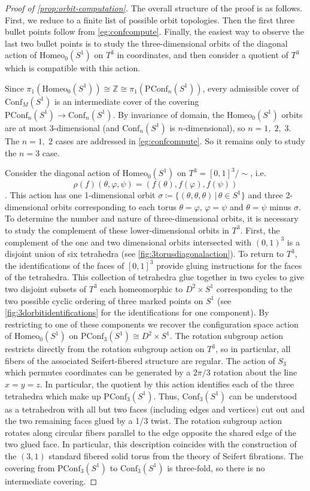 \documentclass[10pt, oneside]{article}
\newcommand{\Z}{\mathbb{Z}}
\newcommand{\homeo}[1][S^1]{\text{Homeo}_0(#1)}
\newcommand{\conf}[2][S^1]{\text{Conf}_{#2}(#1)}
\newcommand{\pconf}[2][S^1]{\text{PConf}_{#2}(#1)}
\theoremstyle{definition}
\theoremstyle{definition}
\begin{document}
\begin{proof}[Proof of \cref{prop:orbit-computation}]
    The overall structure of the proof is as follows. First, we reduce to a finite list of possible orbit topologies. Then the first three bullet points follow from \cref{eg:confcompute}. Finally, the easiest way to observe the last two bullet points is to study the three-dimensional orbits of the diagonal action of $\homeo$ on $T^3$ in coordinates, and then consider a quotient of $T^3$ which is compatible with this action.  

    Since $\pi_1(\homeo) \cong \Z \cong \pi_1(\pconf[S^1]{n})$, every admissible cover of $\conf[S^1]{M}$ is an intermediate cover of the covering $\pconf[S^1]{n}\to \conf[S^1]{n}$. By invariance of domain, the $\homeo$ orbits are at most 3-dimensional (and $\conf[S^1]{n}$ is $n$-dimensional), so $n=1,\; 2,\; 3$. The $n=1,\; 2$ cases are addressed in \cref{eg:confcompute}. So it remains only to study the $n=3$ case. 

    Consider the diagonal action of $\homeo$ on $T^3=[0,1]^3/\sim$, i.e. $$\rho(f)(\theta, \varphi, \psi) = (f(\theta), f(\varphi), f(\psi))$$. This action has one 1-dimensional orbit $\sigma \coloneqq \{(\theta,\theta,\theta)\,\vert\,\theta\in S^1\}$ and three 2-dimensional orbits corresponding to each torus $\theta=\varphi$, $\varphi=\psi$ and $\theta=\psi$ minus $\sigma$. To determine the number and nature of three-dimensional orbits, it is necessary to study the complement of these lower-dimensional orbits in $T^3$. First, the complement of the one and two dimensional orbits intersected with $(0,1)^3$ is a disjoint union of six tetrahedra (see \cref{fig:3torusdiagonalaction}). To return to $T^3$, the identifications of the faces of $[0,1]^3$ provide gluing instructions for the faces of the tetrahedra. This collection of tetrahedra glue together in two cycles to give two disjoint subsets of $T^3$ each homeomorphic to $D^2 \times S^1$ corresponding to the two possible cyclic ordering of three marked points on $S^1$ (see \cref{fig:3dorbitidentifications} for the identifications for one component). By restricting to one of these components we recover the configuration space action of $\homeo$ on $\pconf[S^1]{3}\cong D^2 \times S^1$. The rotation subgroup action restricts directly from the rotation subgroup action on $T^3$, so in particular, all fibers of the associated Seifert-fibered structure are regular. The action of $S_3$ which permutes coordinates can be generated by a $2\pi/3$ rotation about the line $x=y=z$. In particular, the quotient by this action identifies each of the three tetrahedra which make up $\pconf[S^1]{3}$. Thus, $\conf[S^1]{3}$ can be understood as a tetrahedron with all but two faces (including edges and vertices) cut out and the two remaining faces glued by a 1/3 twist. The rotation subgroup action rotates along circular fibers parallel to the edge opposite the shared edge of the two glued face. In particular, this description coincides with the construction of the $(3, 1)$ standard fibered solid torus from the theory of Seifert fibrations. The covering from $\pconf[S^1]{3}$ to $\conf[S^1]{3}$ is three-fold, so there is no intermediate covering.
\end{proof}
\end{document}
